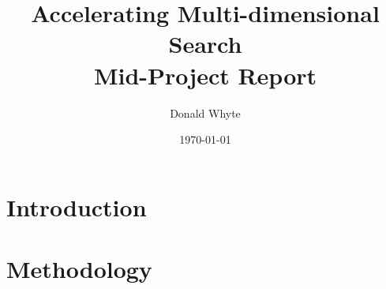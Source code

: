 \documentclass[notitlepage]{article}
\title{Accelerating Multi-dimensional Search \\ Mid-Project Report}
\author{Donald Whyte}
\date{\today}
\begin{document}
\null  %
\nointerlineskip  %
\vfill
\let\snewpage \newpage
\let\newpage \relax
\maketitle
\let \newpage \snewpage
\vfill 
\break %

\tableofcontents

\vspace{4em}

\section{Introduction}
	
	
	
	
\section{Methodology}
	
	
	







\appendix
\setcounter{figure}{0} \renewcommand{\thefigure}{A.\arabic{figure}} 
\setcounter{table}{0} \renewcommand{\thetable}{A.\arabic{table}} 

\end{document}
